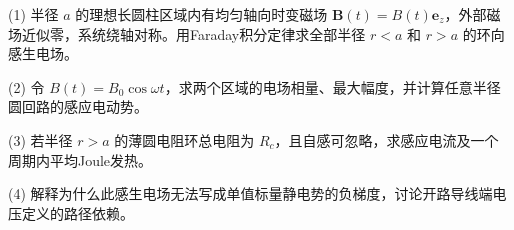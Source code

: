(1) 半径 \(a\) 的理想长圆柱区域内有均匀轴向时变磁场 \(\mathbf B(t)=B(t)\mathbf e_z\)，外部磁场近似零，系统绕轴对称。用Faraday积分定律求全部半径 \(r<a\) 和 \(r>a\) 的环向感生电场。

(2) 令 \(B(t)=B_0\cos\omega t\)，求两个区域的电场相量、最大幅度，并计算任意半径圆回路的感应电动势。

(3) 若半径 \(r>a\) 的薄圆电阻环总电阻为 \(R_c\)，且自感可忽略，求感应电流及一个周期内平均Joule发热。

(4) 解释为什么此感生电场无法写成单值标量静电势的负梯度，讨论开路导线端电压定义的路径依赖。
